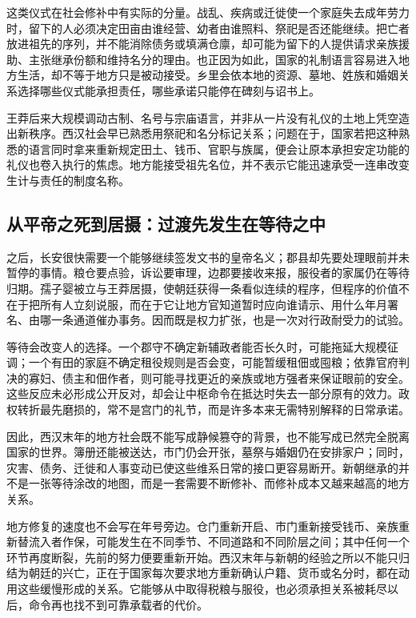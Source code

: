 这类仪式在社会修补中有实际的分量。战乱、疾病或迁徙使一个家庭失去成年劳力时，留下的人必须决定田亩由谁经营、幼者由谁照料、祭祀是否还能继续。把亡者放进祖先的序列，并不能消除债务或填满仓廪，却可能为留下的人提供请求亲族援助、主张继承份额和维持名分的理由。也正因为如此，国家的礼制语言容易进入地方生活，却不等于地方只是被动接受。乡里会依本地的资源、墓地、姓族和婚姻关系选择哪些仪式能承担责任，哪些承诺只能停在碑刻与诏书上。

王莽后来大规模调动古制、名号与宗庙语言，并非从一片没有礼仪的土地上凭空造出新秩序。西汉社会早已熟悉用祭祀和名分标记关系；问题在于，国家若把这种熟悉的语言同时拿来重新规定田土、钱币、官职与族属，便会让原本承担安定功能的礼仪也卷入执行的焦虑。地方能接受祖先名位，并不表示它能迅速承受一连串改变生计与责任的制度名称。

\subsection{从平帝之死到居摄：过渡先发生在等待之中}

之后，长安很快需要一个能够继续签发文书的皇帝名义；郡县却先要处理眼前并未暂停的事情。粮仓要点验，诉讼要审理，边郡要接收来报，服役者的家属仍在等待归期。孺子婴被立与王莽居摄，使朝廷获得一条看似连续的程序，但程序的价值不在于把所有人立刻说服，而在于它让地方官知道暂时应向谁请示、用什么年月署名、由哪一条通道催办事务。因而既是权力扩张，也是一次对行政耐受力的试验。

等待会改变人的选择。一个郡守不确定新辅政者能否长久时，可能拖延大规模征调；一个有田的家庭不确定租役规则是否会变，可能暂缓租佃或囤粮；依靠官府判决的寡妇、债主和佃作者，则可能寻找更近的亲族或地方强者来保证眼前的安全。这些反应未必形成公开反对，却会让中枢命令在抵达时失去一部分原有的效力。政权转折最先磨损的，常不是宫门的礼节，而是许多本来无需特别解释的日常承诺。

因此，西汉末年的地方社会既不能写成静候篡夺的背景，也不能写成已然完全脱离国家的世界。簿册还能被送达，市门仍会开张，墓祭与婚姻仍在安排家户；同时，灾害、债务、迁徙和人事变动已使这些维系日常的接口更容易断开。新朝继承的并不是一张等待涂改的地图，而是一套需要不断修补、而修补成本又越来越高的地方关系。

地方修复的速度也不会写在年号旁边。仓门重新开启、市门重新接受钱币、亲族重新替流入者作保，可能发生在不同季节、不同道路和不同阶层之间；其中任何一个环节再度断裂，先前的努力便要重新开始。西汉末年与新朝的经验之所以不能只归结为朝廷的兴亡，正在于国家每次要求地方重新确认户籍、货币或名分时，都在动用这些缓慢形成的关系。它能够从中取得税粮与服役，也必须承担关系被耗尽以后，命令再也找不到可靠承载者的代价。

